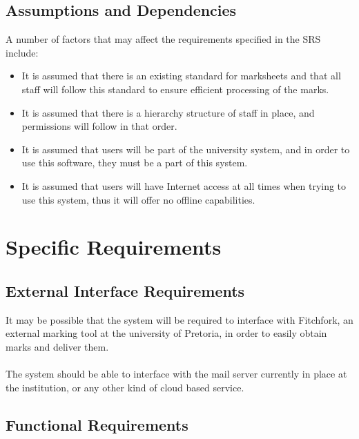 \documentclass[a4paper,12pt]{article}
\begin{document}
        \subsection{Assumptions and Dependencies}
        A number of factors that may affect the requirements specified in the SRS include:
        \begin{itemize}
        	\item It is assumed that there is an existing standard for marksheets and that all staff will follow this standard to ensure efficient processing of the marks.
        	\item It is assumed that there is a hierarchy structure of staff in place, and permissions will follow in that order. 
        	\item It is assumed that users will be part of the university system, and in order to use this software, they must be a part of this system.
        	\item It is assumed that users will have Internet access at all times when trying to use this system, thus it will offer no offline capabilities.
        	
        \end{itemize}
    
    	\pagebreak
    	    	
    	\section{Specific Requirements}
    
    	\subsection{External Interface Requirements}
    	
    	It may be possible that the system will be required to interface with Fitchfork, an external marking tool at the university of Pretoria, in order to easily obtain marks and deliver them.\\\\	
    	The system should be able to interface with the mail server currently in place at the institution, or any other kind of cloud based service.
    	
        \subsection{Functional Requirements}
\end{document}
